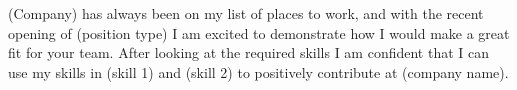 (Company) has always been on my list of places to work, and with the recent opening of (position type) I am excited to demonstrate how I would make a great fit for your team. After looking at the required skills I am confident that I can use my skills in (skill 1) and (skill 2) to positively contribute at (company name).
 